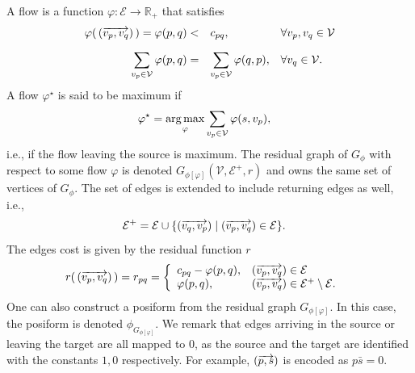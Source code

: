 A flow is a function $\varphi:\mathcal{E}\rightarrow \mathbb{R}_{+}$ that satisfies
\begin{equation*}
	\begin{array}{rll}
	\displaystyle
	\varphi(\,( \overrightarrow{ v_p,v_q} )\,) = \varphi (p,q) <& c_{pq},&  \forall v_p,v_q \in \mathcal{V} \\[1em]
	\displaystyle
	\sum_{v_p \in \mathcal{V}}{\varphi(p,q)} =& \displaystyle \sum_{v_p \in \mathcal{V}}{\varphi (q,p)}, & \forall v_q \in \mathcal{V}.	
	\end{array}
\end{equation*}
%
A flow $\varphi ^{\star}$ is said to be maximum if 
\begin{align*}
	\varphi ^{\star} &= \operatorname*{arg\,max}_{\varphi} \sum_{v_p \in \mathcal{V}}{\varphi(s,v_p)},
\end{align*}
%
i.e., if the flow leaving the source is maximum. The residual graph of $G_{\phi}$ with respect to some flow $\varphi$ is denoted $G_{ \phi [ \varphi ] }(\mathcal{V},\mathcal{E}^+,r)$ and owns the same set of vertices of $G_{\phi}$. The set of edges is extended to include returning edges as well, i.e.,
\begin{align*}
	\mathcal{E}^+ &= \mathcal{E} \cup \{ ( \overrightarrow{ v_q,v_p} ) \; | \; ( \overrightarrow{ v_p,v_q} ) \in \mathcal{E} \}.
\end{align*}
%
The edges cost is given by the residual function $r$
\begin{align*}
	r(\, ( \overrightarrow{ v_p,v_q} ) \, ) = r_{pq} &= \left\{ \begin{array}{ll}
	c_{pq} - \varphi( p,q ), & ( \overrightarrow{ v_p,v_q} ) \in \mathcal{E}\\
	\varphi( p,q ), & ( \overrightarrow{ v_p,v_q} ) \in \mathcal{E}^+ \setminus \mathcal{E}.
\end{array}\right.	 
\end{align*}
%
One can also construct a posiform from the residual graph $G_{ \phi [ \varphi ] }$. In this case, the posiform is denoted $\phi_{G_{ \phi [ \varphi ] }}$. We remark that edges arriving in the source or leaving the target are all mapped to $0$, as the source and the target are identified with the constants $1,0$ respectively. For example, $( \overrightarrow{ p,s} )$ is encoded as $p\bar{s}=0$.

